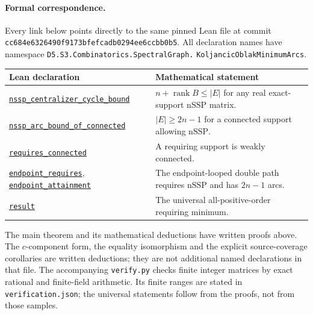 \documentclass[11pt]{article}
\newcommand{\nssp}{\mathrm{nSSP}}
\newcommand{\leanlink}[1]{\href{https://github.com/the-omega-institute/trureturing/blob/cc684e6326490f9173bfefcadb0294ee6ccbb0b5/D5/S3/Combinatorics/SpectralGraph/KoljancicOblakMinimumArcs.lean}{\texttt{#1}}}
\begin{document}
\paragraph{Formal correspondence.}
Every link below points directly to the same pinned Lean file
at commit \texttt{cc684e6326490f9173bfefcadb0294ee6ccbb0b5}.
All declaration names have namespace
\texttt{D5.S3.Combinatorics.SpectralGraph.}\allowbreak
\texttt{KoljancicOblakMinimumArcs}.
\begin{center}\small
\begin{tabularx}{\textwidth}{@{}p{}X@{}}
\toprule
Lean declaration & Mathematical statement\\
\midrule
\leanlink{nssp\_centralizer\_cycle\_bound} &
$n+\operatorname{rank}B\leq |E|$ for any real exact-support $\nssp$ matrix.\\
\leanlink{nssp\_arc\_bound\_of\_connected} &
$|E|\geq2n-1$ for a connected support allowing $\nssp$.\\
\leanlink{requires\_connected} & A requiring support is weakly connected.\\
\leanlink{endpoint\_requires}, \leanlink{endpoint\_attainment} &
The endpoint-looped double path requires $\nssp$ and has $2n-1$ arcs.\\
\leanlink{result} & The universal all-positive-order requiring minimum.\\
\bottomrule
\end{tabularx}
\end{center}
The main theorem and its mathematical deductions have written proofs above. The $c$-component
form, the equality isomorphism and the explicit source-coverage
corollaries are written deductions; they are not additional named
declarations in that file. The accompanying \texttt{verify.py} checks
finite integer matrices by exact rational and finite-field arithmetic.
Its finite ranges are stated in \texttt{verification.json}; the
universal statements follow from the proofs, not from those samples.
\end{document}
